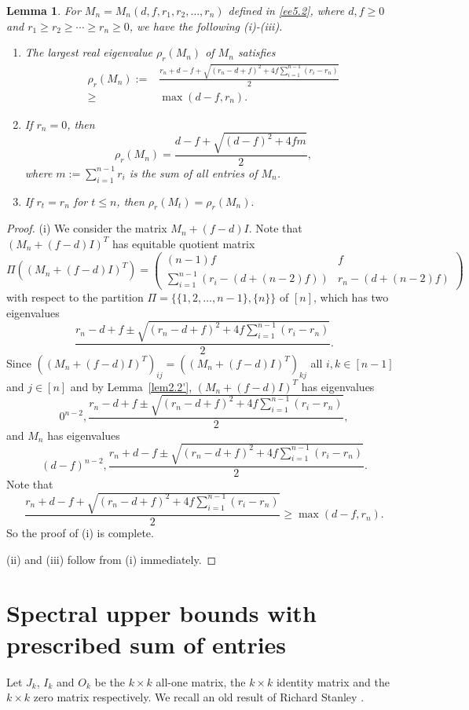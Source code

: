 \documentclass[final,3p, times, 12pt]{elsarticle}
\theoremstyle{plain}
\newtheorem{lem}[thm]{Lemma}
\theoremstyle{definition}
\theoremstyle{remark}
\numberwithin{equation}{section}
\begin{document}
\begin{lem}\label{l7.1} For $M_n=M_n(d, f, r_1, r_2, \ldots, r_n)$ defined in \eqref{ee5.2}, where  $d, f\geq 0$ and $r_1\geq r_2\geq \cdots\geq r_n\geq 0$, we have  the following (i)-(iii).
\begin{enumerate}
\item [(i)] The largest real eigenvalue $\rho_r(M_n)$ of $M_n$ satisfies \begin{align*}
    \rho_r(M_n):=&\frac{r_n+d-f+\sqrt{(r_n-d+f)^2+4f\sum_{i=1}^{n-1}(r_i-r_n)}}{2}\\
    \geq& \max(d-f, r_n).\end{align*}
\item[(ii)] If $r_n=0$, then $$\rho_r(M_n)=\frac{d-f+\sqrt{(d-f)^2+4f m}}{2},$$
where $m:=\sum_{i=1}^{n-1} r_i$ is the sum of all entries of $M_n$.
\item [(iii)]  If $r_t=r_n$ for $t\leq n$, then $\rho_r(M_t)=\rho_r(M_n).$
\end{enumerate}
\end{lem}
\begin{proof}
(i)  We consider the matrix $M_n+(f-d)I$. Note that $(M_n+(f-d)I)^T$ has equitable quotient matrix
$$\Pi((M_n+(f-d)I)^T)=\begin{pmatrix} (n-1)f & f \\  \sum_{i=1}^{n-1} (r_i-(d+(n-2)f))  & r_n-(d+(n-2)f) \end{pmatrix}$$
with respect to the  partition $\Pi=\{\{1, 2, \ldots, n-1\}, \{n\} \}$ of $[n]$,
which has two eigenvalues $$\frac{r_n-d+f\pm\sqrt{(r_n-d+f)^2+4f\sum_{i=1}^{n-1}(r_i-r_n)}}{2}.$$
Since $((M_n+(f-d)I)^T)_{ij}=((M_n+(f-d)I)^T)_{kj}$ all $i,k\in [n-1]$ and $j\in [n]$ and by  Lemma~\ref{lem2.2'}, $(M_n+(f-d)I)^T$ has eigenvalues
$$0^{n-2},\frac{r_n-d+f\pm\sqrt{(r_n-d+f)^2+4f\sum_{i=1}^{n-1}(r_i-r_n)}}{2},$$
and $M_n$ has eigenvalues
$$(d-f)^{n-2},\frac{r_n+d-f\pm\sqrt{(r_n-d+f)^2+4f\sum_{i=1}^{n-1}(r_i-r_n)}}{2}.$$
Note that
$$\frac{r_n+d-f+\sqrt{(r_n-d+f)^2+4f\sum_{i=1}^{n-1}(r_i-r_n)}}{2}\geq \max(d-f, r_n).$$
So the proof of (i) is complete.


(ii) and (iii)  follow from (i) immediately.
\end{proof}


\section{Spectral upper bounds with prescribed sum of entries}

Let $J_k$, $I_k$ and $O_{k}$ be the $k\times k$ all-one matrix, the $k\times k$ identity matrix and the $k\times k$ zero matrix respectively. We recall an old  result of Richard Stanley \cite{s87}.
\end{document}
